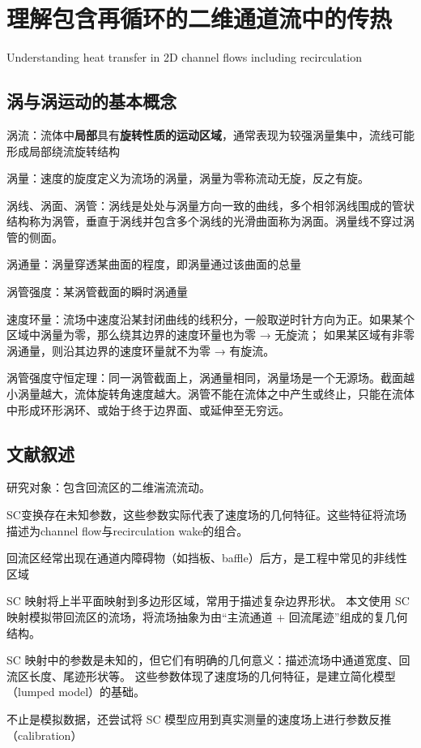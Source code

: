 
\section{理解包含再循环的二维通道流中的传热}
Understanding heat transfer in 2D channel flows including recirculation

\subsection{涡与涡运动的基本概念}
涡流：流体中\textbf{局部}具有\textbf{旋转性质的运动区域}，通常表现为较强涡量集中，流线可能形成局部绕流旋转结构

涡量：速度的旋度定义为流场的涡量，涡量为零称流动无旋，反之有旋。

涡线、涡面、涡管：涡线是处处与涡量方向一致的曲线，多个相邻涡线围成的管状结构称为涡管，垂直于涡线并包含多个涡线的光滑曲面称为涡面。涡量线不穿过涡管的侧面。

涡通量：涡量穿透某曲面的程度，即涡量通过该曲面的总量

涡管强度：某涡管截面的瞬时涡通量

速度环量：流场中速度沿某封闭曲线的线积分，一般取逆时针方向为正。如果某个区域中涡量为零，那么绕其边界的速度环量也为零 → 无旋流；
如果某区域有非零涡通量，则沿其边界的速度环量就不为零 → 有旋流。

涡管强度守恒定理：同一涡管截面上，涡通量相同，涡量场是一个无源场。截面越小涡量越大，流体旋转角速度越大。涡管不能在流体之中产生或终止，只能在流体中形成环形涡环、或始于终于边界面、或延伸至无穷远。
\subsection{文献叙述}
研究对象：包含回流区的二维湍流流动。

SC变换存在未知参数，这些参数实际代表了速度场的几何特征。这些特征将流场描述为channel flow与recirculation wake的组合。

回流区经常出现在通道内障碍物（如挡板、baffle）后方，是工程中常见的非线性区域

SC 映射将上半平面映射到多边形区域，常用于描述复杂边界形状。
本文使用 SC 映射模拟带回流区的流场，将流场抽象为由“主流通道 + 回流尾迹”组成的复几何结构。

SC 映射中的参数是未知的，但它们有明确的几何意义：描述流场中通道宽度、回流区长度、尾迹形状等。
这些参数体现了速度场的几何特征，是建立简化模型（lumped model）的基础。

不止是模拟数据，还尝试将 SC 模型应用到真实测量的速度场上进行参数反推（calibration）

